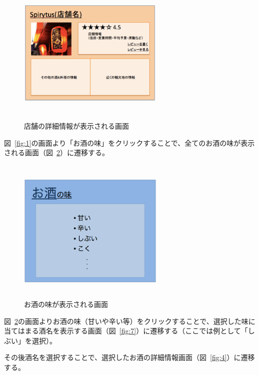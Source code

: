 \documentclass[a4j,titlepage]{jarticle}
\begin{document}
\begin {figure}[!htbp]
    \begin{center}
    \includegraphics [height=7cm, width=7cm]{5.eps}
    \caption {店舗の詳細情報が表示される画面}
    \label {fig:5}
    \end{center}
\end {figure}

図~\ref{fig:1}の画面より「お酒の味」をクリックすることで、全てのお酒の味が表示される画面（図~\ref{fig:6}）に遷移する。
\clearpage
\begin {figure}[!htbp]
    \begin{center}
    \includegraphics [height=7cm, width=7cm]{6.eps}
    \caption {お酒の味が表示される画面}
    \label {fig:6}
    \end{center}
\end {figure}
図~\ref{fig:6}の画面よりお酒の味（甘いや辛い等）をクリックすることで、選択した味に当てはまる酒名を表示する画面（図~\ref{fig:7}）に遷移する（ここでは例として「しぶい」を選択）。



その後酒名を選択することで、選択したお酒の詳細情報画面（図~\ref{fig:4}）に遷移する。
\end{document}
